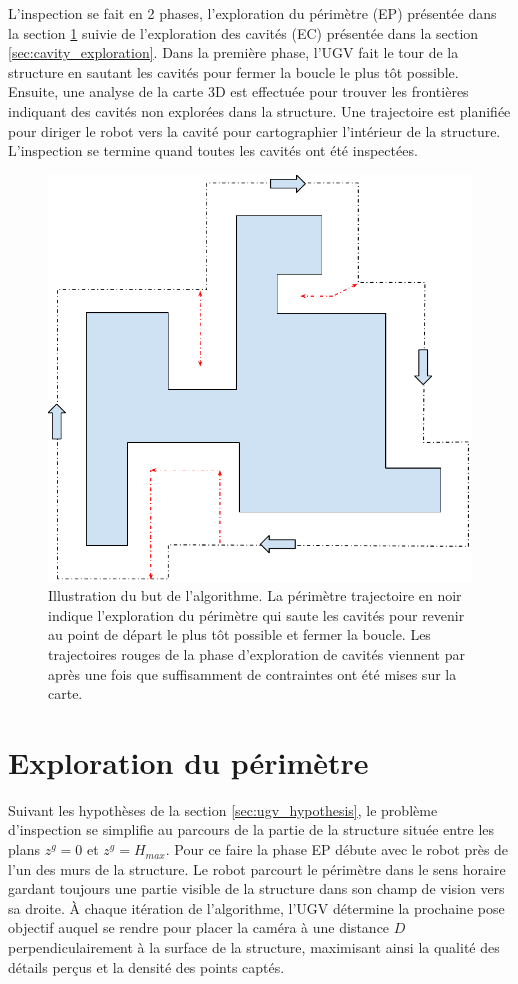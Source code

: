 L'inspection se fait en 2 phases, l'exploration du périmètre (EP) présentée dans la section \ref{sec:perimeter_exploration} suivie de l'exploration des cavités (EC) présentée dans la section \ref{sec:cavity_exploration}. Dans la première phase, l'UGV fait le tour de la structure en sautant les cavités pour fermer la boucle le plus tôt possible. Ensuite, une analyse de la carte 3D est effectuée pour trouver les frontières indiquant des cavités non explorées dans la structure. Une trajectoire est planifiée pour diriger le robot vers la cavité pour cartographier l'intérieur de la structure. L'inspection se termine quand toutes les cavités ont été inspectées.

\begin{figure}[ht]
  \centering
  \includegraphics[width=0.5\linewidth]{images/ugv_goal}
  \caption[Illustration de l'algorithme de cartographie par UGV]{Illustration du but de l'algorithme. La périmètre trajectoire en noir indique l'exploration du périmètre qui saute les cavités pour revenir au point de départ le plus tôt possible et fermer la boucle. Les trajectoires rouges de la phase d'exploration de cavités viennent par après une fois que suffisamment de contraintes ont été mises sur la carte.}
  \label{fig:ugv_overview}
\end{figure}

\section{Exploration du périmètre} \label{sec:perimeter_exploration}

Suivant les hypothèses de la section \ref{sec:ugv_hypothesis}, le problème d'inspection se simplifie au parcours de la partie de la structure située entre les plans $z^g = 0$ et $z^g = H_{max}$. Pour ce faire la phase EP débute avec le robot près de l'un des murs de la structure. Le robot parcourt le périmètre dans le sens horaire gardant toujours une partie visible de la structure dans son champ de vision vers sa droite. À chaque itération de l'algorithme, l'UGV détermine la prochaine pose objectif auquel se rendre pour placer la caméra à une distance $D$ perpendiculairement à la surface de la structure, maximisant ainsi la qualité des détails perçus et la densité des points captés.

